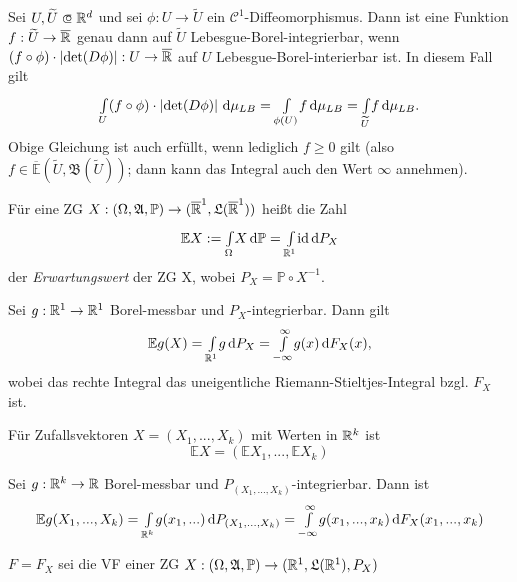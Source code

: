 \documentclass{cheat-sheet}
\newcommand{\Alg}{\mathfrak{A}} %
\newcommand{\LebAlg}{\mathfrak{L}} %
\renewcommand{\P}{\mathbb{P}} %
\newcommand{\E}{\mathbb{E}} %
\newcommand{\Bor}{\mathfrak{B}} %
\begin{document}
\begin{satz}[Transformationssatz]
  Sei $U, \widetilde{U} \opn \R^d$ und sei $\phi : U \to \widetilde{U}$ ein $\mathcal{C}^1$-Diffeomorphismus. Dann ist eine Funktion $f : \widetilde{U} \to \overline{\mathbb{R}}$ genau dann auf $\widetilde{U}$ Lebesgue-Borel-integrierbar, wenn $(f \circ \phi) \cdot \left|\det(D\phi)\right| : U \to \overline{\mathbb{R}}$ auf $U$ Lebesgue-Borel-interierbar ist. In diesem Fall gilt
  \[ {\textstyle \int\limits_{U}^{}} (f \circ \phi) \cdot \left|\det(D\phi)\right| \,\mathrm{d} \mu_{LB} = {\textstyle \int\limits_{\phi(U)}^{}} f \,\mathrm{d} \mu_{LB} = {\textstyle \int\limits_{\widetilde{U}}^{}} f \,\mathrm{d} \mu_{LB}. \]
  Obige Gleichung ist auch erfüllt, wenn lediglich $f \geq 0$ gilt (also $f \in \overline{\E}(\widetilde{U}, \Bor(\widetilde{U}))$; dann kann das Integral auch den Wert $\infty$ annehmen).
\end{satz}

\begin{defn}
  Für eine ZG $X : (\Omega, \Alg, \P) \to (\ER^1, \LebAlg(\ER^1))$ heißt die Zahl
  \[ \E X := \Int{\Omega}{}{X}{\P} = \Int{\R^1}{}{\id}{P_X} \]
  der \emph{Erwartungswert} der ZG X, wobei $P_X = \P \circ X^{-1}$.
\end{defn}

\begin{kor}
  Sei $g : \mathbb{R}^1 \to \mathbb{R}^1$ Borel-messbar und $P_X$-integrierbar. Dann gilt
  \[ \E g(X) = \Int{\R^1}{}{g}{P_X} = \Int{- \infty}{\infty}{g(x)}{F_X(x)}, \]
  wobei das rechte Integral das uneigentliche Riemann-Stieltjes-Integral bzgl. $F_X$ ist.
\end{kor}

\begin{defn}
  Für Zufallsvektoren $X = (X_1, ..., X_k)$ mit Werten in $\mathbb{R}^k$ ist
  \[ \E X = (\E X_1, ..., \E X_k) \]
\end{defn}

Sei $g : \mathbb{R}^k \to \mathbb{R}$ Borel-messbar und $P_{(X_1, ..., X_k)}$-integrierbar. Dann ist
\[ \E g(X_1, ..., X_k) = \Int{\R^k}{}{g(x_1, ...)}{P_{(X_1, ..., X_k)}} = \Int{-\infty}{\infty}{g(x_1, ..., x_k)}{F_X(x_1, ..., x_k)} \]



$F = F_X$ sei die VF einer ZG $X : (\Omega, \Alg, \P) \to (\R^1, \LebAlg(\R^1), P_X)$
\end{document}
